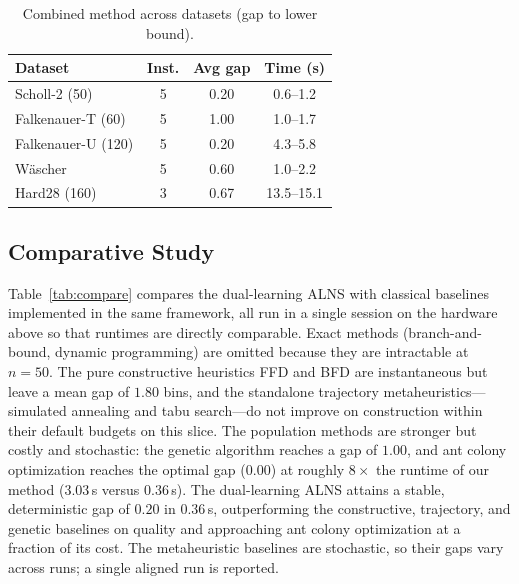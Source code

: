 \documentclass[conference]{IEEEtran}
\begin{document}
\begin{table}[htbp]
	\caption{Combined method across datasets (gap to lower bound).}
	\label{tab:multi}
	\centering
	\begin{tabular}{l c c c}
		\hline
		\textbf{Dataset}   & \textbf{Inst.} & \textbf{Avg gap} & \textbf{Time (s)} \\
		\hline
		Scholl-2 (50)      & 5              & 0.20             & 0.6--1.2          \\
		Falkenauer-T (60)  & 5              & 1.00             & 1.0--1.7          \\
		Falkenauer-U (120) & 5              & 0.20             & 4.3--5.8          \\
		W\"ascher          & 5              & 0.60             & 1.0--2.2          \\
		Hard28 (160)       & 3              & 0.67             & 13.5--15.1        \\
		\hline
	\end{tabular}
\end{table}

\subsection{Comparative Study}
Table~\ref{tab:compare} compares the dual-learning ALNS with classical baselines
implemented in the same framework, all run in a single session on the hardware
above so that runtimes are directly comparable. Exact methods (branch-and-bound,
dynamic programming) are omitted because they are intractable at $n=50$. The pure
constructive heuristics FFD and BFD are instantaneous but leave a mean gap of
$1.80$ bins, and the standalone trajectory metaheuristics---simulated annealing
and tabu search---do not improve on construction within their default budgets on
this slice. The population methods are stronger but costly and stochastic: the
genetic algorithm reaches a gap of $1.00$, and ant colony optimization reaches the
optimal gap ($0.00$) at roughly $8\times$ the runtime of our method ($3.03$\,s
versus $0.36$\,s). The dual-learning ALNS attains a stable, deterministic gap of
$0.20$ in $0.36$\,s, outperforming the constructive, trajectory, and genetic
baselines on quality and approaching ant colony optimization at a fraction of its
cost. The metaheuristic baselines are stochastic, so their gaps vary across runs;
a single aligned run is reported.
\end{document}
